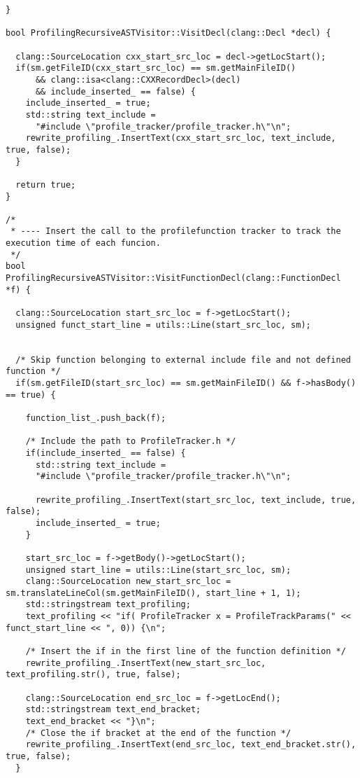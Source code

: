 \documentclass[a4paper,11pt,twoside]{book}
\begin{document}
\begin{lstlisting}[language=CCC, caption=driver/program.cpp]
}

bool ProfilingRecursiveASTVisitor::VisitDecl(clang::Decl *decl) {

  clang::SourceLocation cxx_start_src_loc = decl->getLocStart();
  if(sm.getFileID(cxx_start_src_loc) == sm.getMainFileID() 
      && clang::isa<clang::CXXRecordDecl>(decl)
      && include_inserted_ == false) {
    include_inserted_ = true;
    std::string text_include = 
      "#include \"profile_tracker/profile_tracker.h\"\n";
    rewrite_profiling_.InsertText(cxx_start_src_loc, text_include, true, false);
  }

  return true;
}

/*
 * ---- Insert the call to the profilefunction tracker to track the execution time of each funcion.
 */
bool ProfilingRecursiveASTVisitor::VisitFunctionDecl(clang::FunctionDecl *f) {     
    
  clang::SourceLocation start_src_loc = f->getLocStart();
  unsigned funct_start_line = utils::Line(start_src_loc, sm);


  /* Skip function belonging to external include file and not defined function */
  if(sm.getFileID(start_src_loc) == sm.getMainFileID() && f->hasBody() == true) {
  	
    function_list_.push_back(f);

    /* Include the path to ProfileTracker.h */
    if(include_inserted_ == false) {
      std::string text_include = 
      "#include \"profile_tracker/profile_tracker.h\"\n";
      
      rewrite_profiling_.InsertText(start_src_loc, text_include, true, false);
      include_inserted_ = true;
    } 

    start_src_loc = f->getBody()->getLocStart();
  	unsigned start_line = utils::Line(start_src_loc, sm);
    clang::SourceLocation new_start_src_loc = sm.translateLineCol(sm.getMainFileID(), start_line + 1, 1);
    std::stringstream text_profiling;
    text_profiling << "if( ProfileTracker x = ProfileTrackParams(" << funct_start_line << ", 0)) {\n";
    
    /* Insert the if in the first line of the function definition */
    rewrite_profiling_.InsertText(new_start_src_loc, text_profiling.str(), true, false);

    clang::SourceLocation end_src_loc = f->getLocEnd();
    std::stringstream text_end_bracket;
    text_end_bracket << "}\n";
    /* Close the if bracket at the end of the function */
    rewrite_profiling_.InsertText(end_src_loc, text_end_bracket.str(), true, false);
  }


\end{lstlisting}
\end{document}
